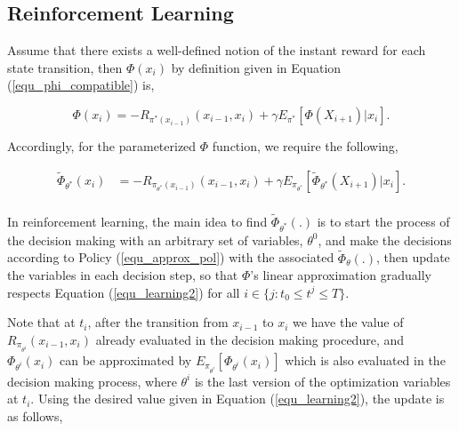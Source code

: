 \documentclass[12pt]{aastex62}
\theoremstyle{definition}
\begin{document}
\subsection{Reinforcement Learning}

Assume that there exists a well-defined notion of the instant reward for each state transition, then $\Phi(x_{{i}})$ by definition given in Equation (\ref{equ_phi_compatible}) is,

\begin{equation} \label{equ_learning1}
\Phi(x_{i}) = - R_{\pi^*(x_{i-1})}(x_{i-1},x_i)  + \gamma E_{\pi^*}[\Phi(X_{{i+1}})|x_i].
\end{equation}

Accordingly, for the parameterized $\Phi$ function, we require the following,

\begin{equation} \label{equ_learning2}
\begin{aligned}
\tilde \Phi_{\theta^*}(x_{i}) &=  - R_{\pi_{\theta^*}(x_{i-1})}(x_{i-1},x_i)  + \gamma E_{\pi_{\theta^*}}[\tilde \Phi_{\theta^*}(X_{{i+1}})|x_i].\\
\end{aligned}
\end{equation}

In reinforcement learning, the main idea to find $\tilde {\Phi}_{\theta^*}(.)$ is to start the process of the decision making with an arbitrary set of variables, $\theta^0$, and make the decisions according to Policy (\ref{equ_approx_pol}) with the associated $\tilde \Phi_{\theta}(.)$, then update the variables in each decision step, so that $\Phi$'s linear approximation gradually respects Equation (\ref{equ_learning2}) for all $i \in \{j: t_0 \leq t^j \leq T\}$.

Note that at $t_i$, after the transition from $x_{{i-1}}$ to $x_{{i}}$ we have the value of $R_{\pi_{\theta^i}}(x_{i-1},x_i) $ already evaluated in the decision making procedure, and  $\Phi_{\theta^i}(x_{i})$ can be approximated by $E_{\pi_{\theta^i}}[ \Phi_{\theta^i}(x_{i})]$ which is also evaluated in the decision making process, where $\theta^i$ is the last version of the optimization variables at $t_i$. Using the desired value given in Equation (\ref{equ_learning2}), the update is as follows,
\end{document}
